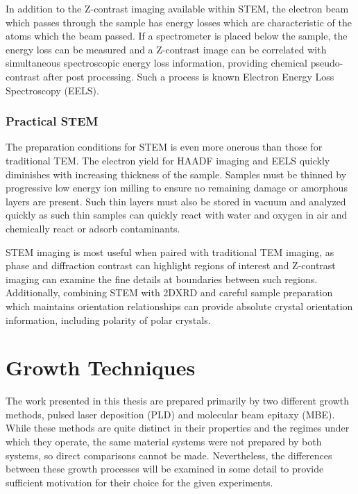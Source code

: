 In addition to the Z-contrast imaging available within STEM, the electron beam which passes through the sample has energy losses which are characteristic of the atoms which the beam passed. If a spectrometer is placed below the sample, the energy loss can be measured and a Z-contrast image can be correlated with simultaneous spectroscopic energy loss information, providing chemical pseudo-contrast after post processing. Such a process is known Electron Energy Loss Spectroscopy (EELS).

\subsubsection{Practical STEM}
The preparation conditions for STEM is even more onerous than those for traditional TEM. The electron yield for HAADF imaging and EELS quickly diminishes with increasing thickness of the sample. Samples must be thinned by progressive low energy ion milling to ensure no remaining damage or amorphous layers are present. Such thin layers must also be stored in vacuum and analyzed quickly as such thin samples can quickly react with water and oxygen in air and chemically react or adsorb contaminants.

STEM imaging is most useful when paired with traditional TEM imaging, as phase and diffraction contrast can highlight regions of interest and Z-contrast imaging can examine the fine details at boundaries between such regions. Additionally, combining STEM with 2DXRD and careful sample preparation which maintains orientation relationships can provide absolute crystal orientation information, including polarity of polar crystals.

\section{Growth Techniques}
The work presented in this thesis are prepared primarily by two different growth methods, pulsed laser deposition (PLD) and molecular beam epitaxy (MBE). While these methods are quite distinct in their properties and the regimes under which they operate, the same material systems were not prepared by both systems, so direct comparisons cannot be made. Nevertheless, the differences between these growth processes will be examined in some detail to provide sufficient motivation for their choice for the given experiments.
